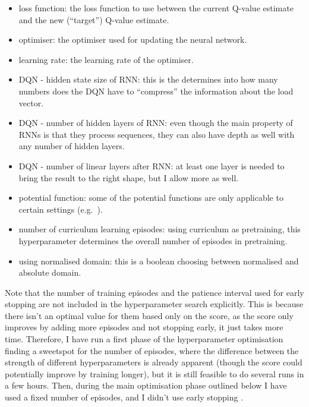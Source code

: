 \begin{itemize}
    \item loss function: the loss function to use between the current Q-value estimate and the new (``target'') Q-value estimate. 
    
    \item optimiser: the optimiser used for updating the neural network. 
    
    \item learning rate: the learning rate of the optimiser. 
    
    \item DQN - hidden state size of RNN: this is the determines into how many numbers does the DQN have to ``compress'' the information about the load vector.
    
    \item DQN - number of hidden layers of RNN: even though the main property of RNNs is that they process sequences, they can also have depth as well with any number of hidden layers.
    
    \item DQN - number of linear layers after RNN: at least one layer is needed to bring the result to the right shape, but I allow more as well.
    
    \item potential function: some of the potential functions are only applicable to certain settings (e.g.\ \GraphicalTwoChoice).
    
    \item number of curriculum learning episodes: using curriculum as pretraining, this hyperparameter determines the overall number of episodes in pretraining.
    
    \item using normalised domain: this is a boolean choosing between normalised and absolute domain.
    
    


\end{itemize}


Note that the number of training episodes and the patience interval used for early stopping are not included in the hyperparameter search explicitly. This is because there isn't an optimal value for them based only on the score, as the score only improves by adding more episodes and not stopping early, it just takes more time. Therefore, I have run a first phase of the hyperparameter optimisation finding a sweetspot for the number of episodes, where the difference between the strength of different hyperparameters is already apparent (though the score could potentially improve by training longer), but it is still feasible to do several runs in a few hours. Then, during the main optimisation phase outlined below I have used a fixed number of episodes, and I didn't use early stopping .



